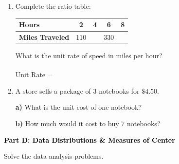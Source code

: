\documentclass[12pt, letterpaper, fleqn]{article}
\newcommand{\blanklong}{\underline{\hspace{6.5cm}}}
\newcommand{\blankshorter}{\underline{\hspace{1.5cm}}}
\begin{document}
\begin{enumerate}[itemsep=2.5cm, leftmargin=0.6cm]
\item Complete the ratio table:
\begin{center}
\begin{tabular}{|l|c|c|c|r|}
\hline
\textbf{Hours} & 2 & 4 & 6 & 8 \\ \hline
\textbf{Miles Traveled} & 110 & \blankshorter & 330 & \blankshorter \\
\hline
\end{tabular}
\end{center}
\vspace{0.5cm}
What is the unit rate of speed in miles per hour? \\ \\
Unit Rate = \blanklong

\item A store sells a package of $3$ notebooks for $\$4.50$. \\
\vspace{0.2cm}

\textbf{a)} What is the unit cost of one notebook? \blanklong \\ 
\vspace{3cm}

\textbf{b)} How much would it cost to buy $7$ notebooks? \blanklong
\end{enumerate}

\newpage

\begin{tcolorbox}[colback=black!10]
    \large\textcolor{black}{\textbf{Part D: Data Distributions \& Measures of Center}}
\end{tcolorbox}

\vspace{3mm}

\noindent
Solve the data analysis problems.

\vspace{5mm}
\end{document}
